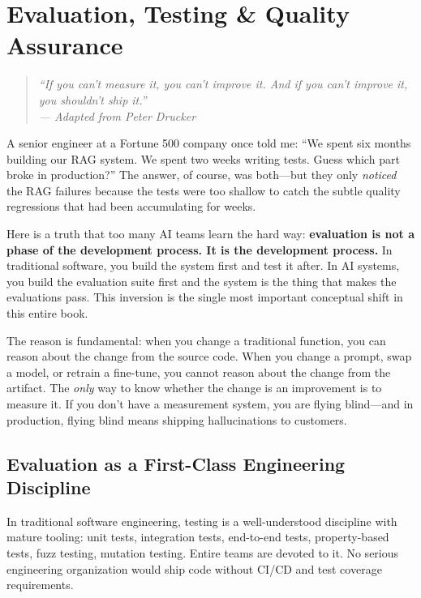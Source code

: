 \chapter{Evaluation, Testing \& Quality Assurance}
\label{ch:evaluation-testing}

\begin{quote}
\itshape
``If you can't measure it, you can't improve it. And if you can't improve it, you shouldn't ship it.''\\
--- Adapted from Peter Drucker
\end{quote}

\vspace{0.5cm}

\noindent
A senior engineer at a Fortune 500 company once told me: ``We spent six months building our RAG system. We spent two weeks writing tests. Guess which part broke in production?'' The answer, of course, was both---but they only \emph{noticed} the RAG failures because the tests were too shallow to catch the subtle quality regressions that had been accumulating for weeks.

Here is a truth that too many AI teams learn the hard way: \textbf{evaluation is not a phase of the development process. It is the development process.} In traditional software, you build the system first and test it after. In AI systems, you build the evaluation suite first and the system is the thing that makes the evaluations pass. This inversion is the single most important conceptual shift in this entire book.

The reason is fundamental: when you change a traditional function, you can reason about the change from the source code. When you change a prompt, swap a model, or retrain a fine-tune, you cannot reason about the change from the artifact. The \emph{only} way to know whether the change is an improvement is to measure it. If you don't have a measurement system, you are flying blind---and in production, flying blind means shipping hallucinations to customers.


\section{Evaluation as a First-Class Engineering Discipline}

In traditional software engineering, testing is a well-understood discipline with mature tooling: unit tests, integration tests, end-to-end tests, property-based tests, fuzz testing, mutation testing. Entire teams are devoted to it. No serious engineering organization would ship code without CI/CD and test coverage requirements.

